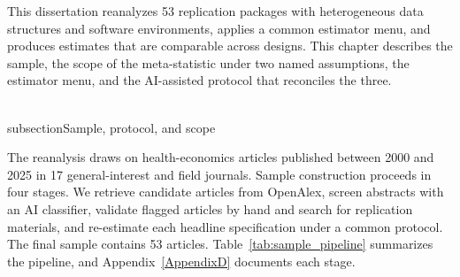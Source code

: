 \documentclass[11pt]{article}
\begin{document}
This dissertation reanalyzes 53 replication packages with heterogeneous data structures and software environments, applies a common estimator menu, and produces estimates that are comparable across designs. This chapter describes the sample, the scope of the meta-statistic under two named assumptions, the estimator menu, and the AI-assisted protocol that reconciles the three.

\\subsection{Sample, protocol, and scope}

The reanalysis draws on health-economics articles published between 2000 and 2025 in 17 general-interest and field journals. Sample construction proceeds in four stages. We retrieve candidate articles from OpenAlex, screen abstracts with an AI classifier, validate flagged articles by hand and search for replication materials, and re-estimate each headline specification under a common protocol. The final sample contains 53 articles. Table~\ref{tab:sample_pipeline} summarizes the pipeline, and Appendix~\ref{AppendixD} documents each stage.
\end{document}
